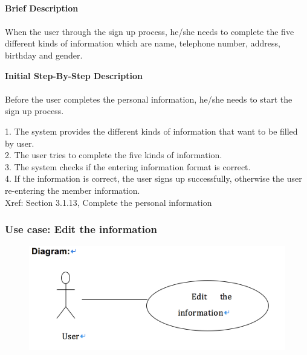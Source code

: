 \documentclass[12pt]{report}
\begin{document}
\paragraph{}
\begin{flushleft}
\textbf{Brief Description }
\paragraph{}
When the user through the sign up process, he/she needs to complete the five different kinds of information which are name, telephone number, address, birthday and gender.\\

\begin{flushleft}
\textbf{Initial Step-By-Step Description }
\paragraph{}
Before the user completes the personal information, he/she needs to start the sign up process.

\begin{flushleft}
1.	The system provides the different kinds of information that want to be filled by user. \\
2.	The user tries to complete the five kinds of information. \\
3.	The system checks if the entering information format is correct. \\
4.	If the information is correct, the user signs up successfully, otherwise the user re-entering the member information. \\
Xref: Section 3.1.13, Complete the personal information 
\end{flushleft}
\end{flushleft}
\end{flushleft}

\newpage
\subsubsection{Use case:  Edit the information }

\begin{figure}[!htb]
  \includegraphics{14.PNG}
\end{figure}
\end{document}

